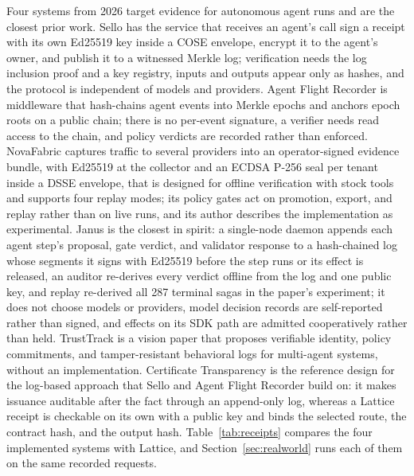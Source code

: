 \documentclass[conference]{IEEEtran}
\begin{document}
Four systems from 2026 target evidence for autonomous agent runs and are the closest
prior work. Sello \cite{figuera2026notarized} has the service that receives an agent's
call sign a receipt with its own Ed25519 key inside a COSE envelope, encrypt it to the
agent's owner, and publish it to a witnessed Merkle log; verification needs the log
inclusion proof and a key registry, inputs and outputs appear only as hashes, and the
protocol is independent of models and providers. Agent Flight Recorder
\cite{bindschaedler2026afr} is middleware that hash-chains agent events into Merkle
epochs and anchors epoch roots on a public chain; there is no per-event signature, a
verifier needs read access to the chain, and policy verdicts are recorded rather than
enforced. NovaFabric \cite{ardebili2026novafabric} captures traffic to several
providers into an operator-signed evidence bundle, with Ed25519 at the collector and an
ECDSA P-256 seal per tenant inside a DSSE envelope, that is designed for offline
verification with stock tools and supports four replay modes; its policy gates act on
promotion, export, and replay rather than on live runs, and its author describes the
implementation as experimental. Janus \cite{arslan2026janus} is the closest in spirit:
a single-node daemon appends each agent step's proposal, gate verdict, and validator
response to a hash-chained log whose segments it signs with Ed25519 before the step
runs or its effect is released, an auditor re-derives every verdict offline from the
log and one public key, and replay re-derived all 287 terminal sagas in the paper's
experiment; it does not choose models or providers, model decision records are
self-reported rather than signed, and effects on its SDK path are admitted
cooperatively rather than held. TrustTrack \cite{li2025trusttrack} is a vision paper
that proposes verifiable identity, policy commitments, and tamper-resistant behavioral
logs for multi-agent systems, without an implementation. Certificate Transparency
\cite{rfc6962,rfc9162} is the reference design for the log-based approach that Sello
and Agent Flight Recorder build on: it makes issuance auditable after the fact through
an append-only log, whereas a Lattice receipt is checkable on its own with a public key
and binds the selected route, the contract hash, and the output hash.
Table~\ref{tab:receipts} compares the four implemented systems with Lattice, and
Section~\ref{sec:realworld} runs each of them on the same recorded requests.
\end{document}
